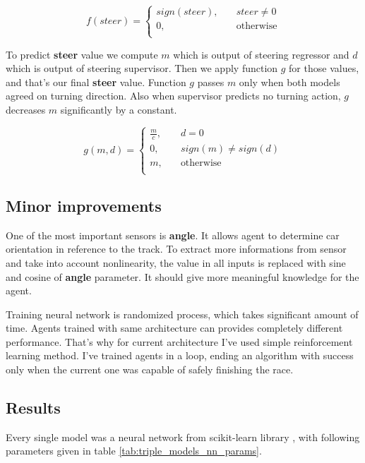 \documentclass[declaration,shortabstract,english,inz]{iithesis}
\begin{document}
$$ f(steer) =  \begin{cases}
    sign(steer), &\quad steer\neq0 \\
    0, &\quad \text{otherwise} \\
  \end{cases}
 $$


To predict \textbf{steer} value we compute $m$ which is output of steering regressor and $d$ which is output of steering supervisor.
Then we apply function $g$ for those values, and that's our final \textbf{steer} value.
Function $g$ passes $m$ only when both models agreed on turning direction.
Also when supervisor predicts no turning action, $g$ decreases $m$ significantly by a constant.

 $$ g(m, d) =  \begin{cases}
    \frac{m}{c},  &\quad d = 0 \\
    0, &\quad sign(m) \neq sign(d) \\
    m, &\quad \text{otherwise} \\
  \end{cases}
 $$

\subsection{Minor improvements}
One of the most important sensors is \textbf{angle}.
It allows agent to determine car orientation in reference to the track.
To extract more informations from sensor and take into account nonlinearity, the value in all inputs is replaced with sine and cosine of \textbf{angle} parameter.
It should give more meaningful knowledge for the agent.



Training neural network is randomized process, which takes significant amount of time.
Agents trained with same architecture can provides completely different performance.
That's why for current architecture I've used simple reinforcement learning method.
I've trained agents in a loop, ending an algorithm with success only when the current one was capable of safely finishing the race.



\subsection{Results}



Every single model was a neural network from scikit-learn library \cite{scikit_learn}, with following parameters given in table \ref{tab:triple_models_nn_params}.
\end{document}
